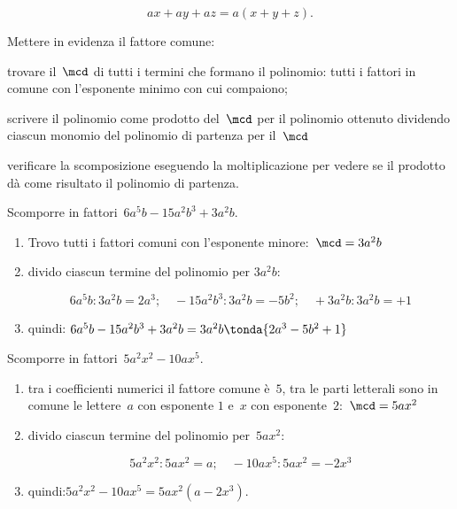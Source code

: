 \vspace{-1.5em}
\[ax+ay+az=a(x+y+z).\]

\begin{procedura}{}{}
Mettere in evidenza il fattore comune:
\begin{enumeratea}
\item trovare il~\(\mcd\) di tutti i termini che formano il polinomio: tutti 
i fattori in comune con l'esponente minimo con cui compaiono;
\item scrivere il polinomio come prodotto del~\(\mcd\) per il polinomio 
ottenuto dividendo ciascun monomio del polinomio di partenza per il~\(\mcd\)
\item verificare la scomposizione eseguendo la moltiplicazione per vedere se 
 il prodotto dà come risultato il polinomio di partenza.
\end{enumeratea}
\end{procedura}

\begin{esempio}{}{}
Scomporre in fattori~\(6a^{5}b-15a^{2}b^{3}+3a^2b\).
\begin{enumerate} [left=0mm, noitemsep]
\item Trovo tutti i fattori comuni con l'esponente 
minore:~\(\mcd=3a^2b\)
\item divido ciascun termine del polinomio per \(3a^2b\):

\vspace{-2em}
\[6a^{5}b : 3a^2b = 2a^{3}; \quad 
  -15a^{2}b^{3} : 3a^2b = -5b^{2}; \quad 
  +3a^2b : 3a^2b = +1\]
\vspace{-2em}
\item quindi:\quad 
\(6a^{5}b-15a^{2}b^{3}+3a^2b=3a^{2}b\tonda{2a^{3}-5b^{2}+1}\)
\end{enumerate}
\end{esempio}

\begin{esempio}{}{}
Scomporre in fattori~\(5a^{2}x^2-10ax^{5}\).
\begin{enumerate} [left=0mm, noitemsep]
\item tra i coefficienti numerici il fattore comune è~\(5\), 
tra le parti letterali sono in comune le lettere~\(a\) con esponente \(1\) 
e~\(x\) con esponente~\(2\):~\(\mcd=5ax^2\)
\item divido ciascun termine del polinomio per~\(5ax^2\):

\vspace{-1.2em}
\[5a^{2}x^2:5ax^2=a; \quad -10ax^{5}:5ax^2=-2x^3\]
\vspace{-1.6em}
\item quindi:\quad \(5a^{2}x^2-10ax^{5}=5ax^2(a-2x^3)\).
\end{enumerate}
\end{esempio}

